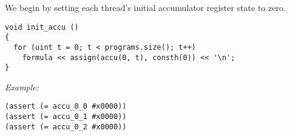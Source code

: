

\noindent
We begin by setting each thread's initial accumulator register state to zero.

\begin{lstlisting}[style=c++]
void init_accu ()
{
  for (uint t = 0; t < programs.size(); t++)
    formula << assign(accu(0, t), consth(0)) << '\n';
}
\end{lstlisting}

\noindent
\emph{Example:} 

\begin{lstlisting}[style=smtlib]
(assert (= accu_0_0 #x0000))
(assert (= accu_0_1 #x0000))
(assert (= accu_0_2 #x0000))
\end{lstlisting}





%

